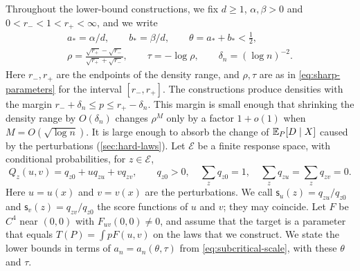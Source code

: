 Throughout the lower-bound constructions, we fix $d\ge1$,
$\alpha,\beta>0$ and $0<r_-<1<r_+<\infty$, and we write
\[\begin{gathered}
 a_*=\alpha/d,\qquad b_*=\beta/d,\qquad
 \theta=a_*+b_*<\tfrac12,\\
 \rho=\frac{\sqrt{r_+}-\sqrt{r_-}}{\sqrt{r_+}+\sqrt{r_-}},\qquad
 \tau=-\log\rho,\qquad \delta_n=(\log n)^{-2}.
\end{gathered}\]
Here $r_-,r_+$ are the endpoints of the density range, and $\rho,\tau$
are as in \eqref{eq:sharp-parameters} for the interval $[r_-,r_+]$.
The constructions produce densities with the margin
$r_-+\delta_n\le p\le r_+-\delta_n$. This margin is small enough that
shrinking the density range by $O(\delta_n)$ changes $\rho^M$ only by
a factor $1+o(1)$ when $M=O(\sqrt{\log n})$. It is large enough to
absorb the change of $\mathbb E_P[D\mid X]$ caused by the perturbations
(\cref{sec:hard-laws}).
Let $\mathcal E$ be a finite response space, with conditional
probabilities, for $z\in\mathcal E$,
\begin{equation}\label{eq:finite-affine-law}
 Q_z(u,v)=q_{z0}+u q_{zu}+v q_{zv},\qquad
 q_{z0}>0,\quad \sum_zq_{z0}=1,\quad
 \sum_zq_{zu}=\sum_zq_{zv}=0.
\end{equation}
Here $u=u(x)$ and $v=v(x)$ are the perturbations. We call
$\mathsf s_u(z)=q_{zu}/q_{z0}$ and $\mathsf s_v(z)=q_{zv}/q_{z0}$ the
score functions of $u$ and $v$; they may coincide. Let $F$ be $C^4$ near
$(0,0)$ with $F_{uv}(0,0)\ne0$, and assume that the target is a
parameter that equals $T(P)=\int pF(u,v)$ on the laws that we
construct. We state the lower bounds in terms of
$a_n=a_n(\theta,\tau)$ from \eqref{eq:subcritical-scale}, with these
$\theta$ and $\tau$.

